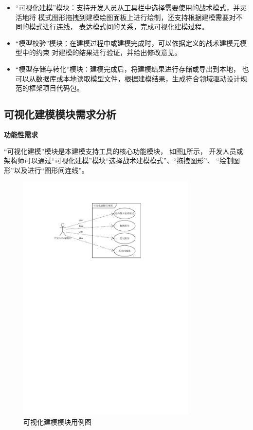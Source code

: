 \begin{itemize}
    \item “可视化建模”模块：支持开发人员从工具栏中选择需要使用的战术模式，并灵活地将
    模式图形拖拽到建模绘图面板上进行绘制，还支持根据建模需要对不同的模式进行连线，
    表达模式间的关系，完成可视化建模过程。
    \item “模型校验”模块：在建模过程中或建模完成时，可以依据定义的战术建模元模型中的约束
    对建模的结果进行验证，并给出修改意见。
    \item “模型存储与转化”模块：建模完成后，将建模结果进行存储或导出到本地，
    也可以从数据库或本地读取模型文件，根据建模结果，生成符合领域驱动设计规范的框架项目代码包。

\end{itemize}

\subsection{可视化建模模块需求分析}

\textbf{功能性需求}

“可视化建模”模块是本建模支持工具的核心功能模块，
如图\ref{us1}所示，
开发人员或架构师可以通过“可视化建模”模块“选择战术建模模式”、“拖拽图形”、
“绘制图形”以及进行“图形间连线”。

\begin{figure}[!htbp] %
    \centering %
    \includegraphics[width=0.8\textwidth]{FIGs/chapter4/us1.pdf} %
    \caption{可视化建模模块用例图} %
    \label{us1} %
\end{figure}%

